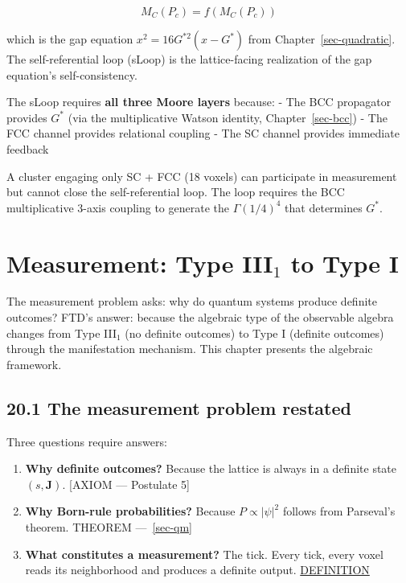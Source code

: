 \documentclass[
  11pt,
  letterpaper,
  twoside,
  openright]{book}
\providecommand{\tightlist}{%
  \setlength{\itemsep}{0pt}\setlength{\parskip}{0pt}}
\begin{document}
\[
M_C(P_c) = f(M_C(P_c))
\]

which is the gap equation \(x^2 = 16G^{*2}(x - G^*)\) from
Chapter~\ref{sec-quadratic}. The self-referential loop (sLoop) is the
lattice-facing realization of the gap equation's self-consistency.

The sLoop requires \textbf{all three Moore layers} because: - The BCC
propagator provides \(G^*\) (via the multiplicative Watson identity,
Chapter~\ref{sec-bcc}) - The FCC channel provides relational coupling -
The SC channel provides immediate feedback

A cluster engaging only SC + FCC (18 voxels) can participate in
measurement but cannot close the self-referential loop. The loop
requires the BCC multiplicative 3-axis coupling to generate the
\(\Gamma(1/4)^4\) that determines \(G^*\).

\chapter{\texorpdfstring{Measurement: Type III\(_1\) to Type
I}{Measurement: Type III\_1 to Type I}}\label{sec-measurement}

The measurement problem asks: why do quantum systems produce definite
outcomes? FTD's answer: because the algebraic type of the observable
algebra changes from Type III\(_1\) (no definite outcomes) to Type I
(definite outcomes) through the manifestation mechanism. This chapter
presents the algebraic framework.

\section{20.1 The measurement problem
restated}\label{the-measurement-problem-restated}

Three questions require answers:

\begin{enumerate}
\def\labelenumi{\arabic{enumi}.}
\tightlist
\item
  \textbf{Why definite outcomes?} Because the lattice is always in a
  definite state \((s, \mathbf{J})\). {[}AXIOM --- Postulate 5{]}
\item
  \textbf{Why Born-rule probabilities?} Because \(P \propto |\psi|^2\)
  follows from Parseval's theorem. THEOREM ---~\ref{sec-qm}
\item
  \textbf{What constitutes a measurement?} The tick. Every tick, every
  voxel reads its neighborhood and produces a definite output.
  \hyperref[definition]{DEFINITION}
\end{enumerate}
\end{document}
